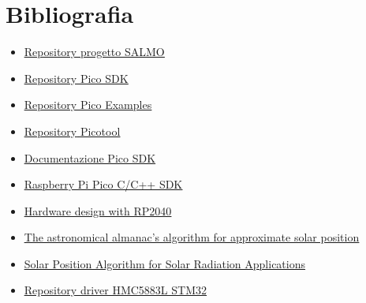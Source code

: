 \chapter{Bibliografia}

\begin{itemize}
  \item
  
  \href{https://github.com/thomasnonis/ppse-2021}{\underline{Repository
  progetto SALMO}}
\item
  
  \href{https://github.com/raspberrypi/pico-sdk}{\underline{Repository
  Pico SDK}}
  
\item
  
  \href{https://github.com/raspberrypi/pico-examples}{\underline{Repository
  Pico Examples}}
  
\item
  
  \href{https://github.com/raspberrypi/picotool}{\underline{Repository}
  \underline{Picotool}}
  
\item
  
  \href{https://raspberrypi.github.io/pico-sdk-doxygen/}{\underline{Documentazione
  Pico SDK}}
  
\item
  
  \href{https://datasheets.raspberrypi.com/pico/raspberry-pi-pico-c-sdk.pdf}{\underline{Raspberry
  Pi Pico C/C++ SDK}}
  
\item
  
  \href{https://datasheets.raspberrypi.com/rp2040/hardware-design-with-rp2040.pdf}{\underline{Hardware
  design with RP2040}}
  
\item
  
  \href{https://www.researchgate.net/publication/222131147_The_Astronomical_Almanac's_algorithm_for_approximate_solar_position_1950-2050}{\underline{The
  astronomical almanac's algorithm for approximate solar position}}
  
\item
  
  \href{https://www.nrel.gov/docs/fy08osti/34302.pdf}{\underline{Solar
  Position Algorithm for Solar Radiation Applications}}
  
\item
  
  \href{https://github.com/jrowberg/i2cdevlib/blob/master/STM32/HMC5883/HMC5883L.h}{\underline{Repository
  driver HMC5883L STM32}}
  

\end{itemize}
